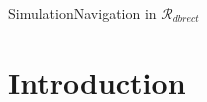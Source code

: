 \documentclass[10pt]{beamer}
\begin{document}
\begin{frame}{Simulation}{Navigation in $\mathcal{R}_{dbrect}$}
  \begin{center}
  \end{center}
\end{frame}

\section{Introduction}
\end{document}
